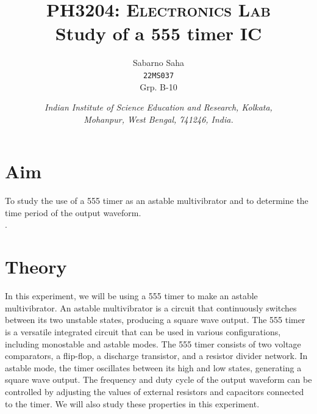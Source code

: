 \documentclass{scrartcl}
\title{
        \Large\textsc{PH3204: Electronics Lab} \\
        \vspace{10pt}
        \Huge \textbf{Study of a 555 timer IC} \\
}
\author{Sabarno Saha \\ \texttt{22MS037} \\ Grp. B-10}
\date{\normalsize
        \textit{Indian Institute of Science Education and Research, Kolkata, \\
        Mohanpur, West Bengal, 741246, India.}
}
\newcommand{\1}{\mathbbm{1}}
\begin{document}
\maketitle
\tableofcontents

\section{Aim}
To study the use of a 555 timer as an astable multivibrator and to determine the time period of the output waveform.\\.

\section{Theory}
In this experiment, we will be using a 555 timer to make an astable multivibrator. An astable 
multivibrator is a circuit that continuously switches between its two unstable states, producing a square wave output. 
The 555 timer is a versatile integrated circuit that can be used in various configurations, including monostable and astable modes.
The 555 timer consists of two voltage comparators, a flip-flop, a discharge transistor, and a resistor divider network. 
In astable mode, the timer oscillates between its high and low states, generating a square wave output. 
The frequency and duty cycle of the output waveform can be controlled by adjusting the values of external resistors and
 capacitors connected to the timer. We will also study these properties in this experiment.
\end{document}

